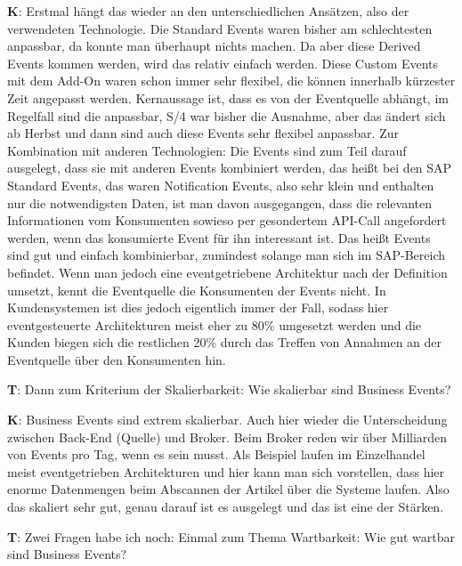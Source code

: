 \begin{list}{X:}{\setlength{\labelsep}{5mm}}
 \item[\textbf{K}:] Erstmal hängt das wieder an den unterschiedlichen Ansätzen, also der verwendeten Technologie. Die Standard Events waren bisher am schlechtesten anpassbar, da konnte man überhaupt nichts machen. Da aber diese Derived Events kommen werden, wird das relativ einfach werden. Diese Custom Events mit dem Add-On waren schon immer sehr flexibel, die können innerhalb kürzester Zeit angepasst werden. Kernaussage ist, dass es von der Eventquelle abhängt, im Regelfall sind die anpassbar, S/4 war bisher die Ausnahme, aber das ändert sich ab Herbst und dann sind auch diese Events sehr flexibel anpassbar. Zur Kombination mit anderen Technologien: Die Events sind zum Teil darauf ausgelegt, dass sie mit anderen Events kombiniert werden, das hei{\ss}t bei den SAP Standard Events, das waren Notification Events, also sehr klein und enthalten nur die notwendigsten Daten, ist man davon ausgegangen, dass die relevanten Informationen vom Konsumenten sowieso per gesondertem API-Call angefordert werden, wenn das konsumierte Event für ihn interessant ist. Das hei{\ss}t Events sind gut und einfach kombinierbar, zumindest solange man sich im SAP-Bereich befindet. Wenn man jedoch eine eventgetriebene Architektur nach der Definition umsetzt, kennt die Eventquelle die Konsumenten der Events nicht. In Kundensystemen ist dies jedoch eigentlich immer der Fall, sodass hier eventgesteuerte Architekturen meist eher zu 80\% umgesetzt werden und die Kunden biegen sich die restlichen 20\% durch das Treffen von Annahmen an der Eventquelle über den Konsumenten hin.
 \item[\textbf{T}:] Dann zum Kriterium der Skalierbarkeit: Wie skalierbar sind Business Events?
 \item[\textbf{K}:] Business Events sind extrem skalierbar. Auch hier wieder die Unterscheidung zwischen Back-End (Quelle) und Broker. Beim Broker reden wir über Milliarden von Events pro Tag, wenn es sein musst. Als Beispiel laufen im Einzelhandel meist eventgetrieben Architekturen und hier kann man sich vorstellen, dass hier enorme Datenmengen beim Abscannen der Artikel über die Systeme laufen. Also das skaliert sehr gut, genau darauf ist es ausgelegt und das ist eine der Stärken.
 \item[\textbf{T}:] Zwei Fragen habe ich noch: Einmal zum Thema Wartbarkeit: Wie gut wartbar sind Business Events?

\end{list}
